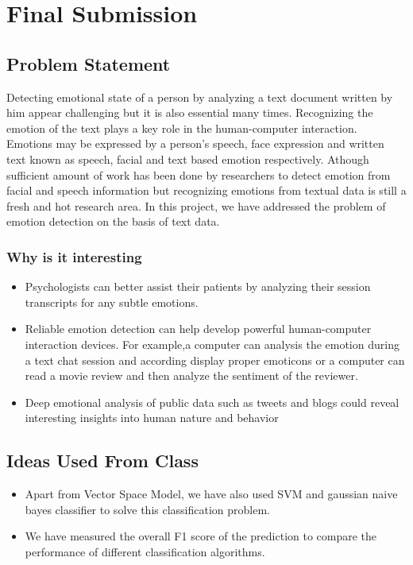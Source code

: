 \chapter{Final Submission}
\section{Problem Statement}
\label{prob-stmt}
Detecting emotional state of a person by analyzing a text document
written by him appear challenging but it is also essential many times. Recognizing the emotion of the text plays a key role in 
the human-computer interaction. Emotions may be expressed by a person's speech, 
face  expression  and  written  text  known  as  speech,  facial  and  text  based  emotion 
respectively. Athough sufficient amount of work has been done by researchers to detect emotion from facial and 
speech information but recognizing  emotions  from  textual  data  is still a fresh and hot 
research area. In this project, we have addressed the problem of emotion detection on the basis of text data.
\subsection{Why is it interesting}
\begin{itemize}
\item Psychologists can better assist their patients by analyzing their session transcripts for any subtle emotions.
\item Reliable emotion detection can help develop powerful human-computer interaction devices. For example,a computer can analysis the emotion during a text chat session and according display proper emoticons or a computer can read a movie review and then analyze the sentiment of the reviewer.
\item Deep  emotional  analysis  of  public  data such  as  tweets  and  blogs  could  reveal  interesting  insights into human nature and behavior
\end{itemize}
\section{Ideas Used From Class}
\label{ideas-from-class}
\begin{itemize}
    \item Apart from Vector Space Model, we have also used SVM and gaussian naive bayes classifier to solve this classification problem.
    \item We have measured the overall F1 score of the prediction to compare the
        performance of different classification algorithms.
\end{itemize}

